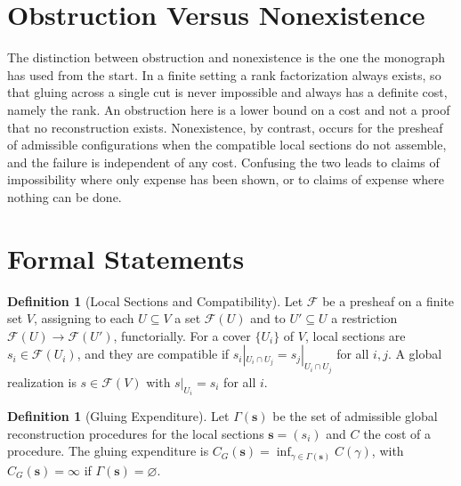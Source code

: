 \documentclass[11pt,letterpaper]{report}
\theoremstyle{plain}
\theoremstyle{definition}
\newtheorem{definition}[theorem]{Definition}
\theoremstyle{remark}
\begin{document}
\section{Obstruction Versus Nonexistence}

The distinction between obstruction and nonexistence is the one the monograph has used from the start. In a finite setting a rank factorization always exists, so that gluing across a single cut is never impossible and always has a definite cost, namely the rank. An obstruction here is a lower bound on a cost and not a proof that no reconstruction exists. Nonexistence, by contrast, occurs for the presheaf of admissible configurations when the compatible local sections do not assemble, and the failure is independent of any cost. Confusing the two leads to claims of impossibility where only expense has been shown, or to claims of expense where nothing can be done.

\section{Formal Statements}

\begin{definition}[Local Sections and Compatibility]\label{def:sections}
Let $\mathcal F$ be a presheaf on a finite set $V$, assigning to each $U\subseteq V$ a set $\mathcal F(U)$ and to $U'\subseteq U$ a restriction $\mathcal F(U)\to\mathcal F(U')$, functorially. For a cover $\{U_i\}$ of $V$, local sections are $s_i\in\mathcal F(U_i)$, and they are compatible if $s_i|_{U_i\cap U_j}=s_j|_{U_i\cap U_j}$ for all $i,j$. A global realization is $s\in\mathcal F(V)$ with $s|_{U_i}=s_i$ for all $i$.
\end{definition}

\begin{definition}[Gluing Expenditure]\label{def:gluing}
Let $\Gamma(\mathbf s)$ be the set of admissible global reconstruction procedures for the local sections $\mathbf s=(s_i)$ and $C$ the cost of a procedure. The gluing expenditure is $C_G(\mathbf s)=\inf_{\gamma\in\Gamma(\mathbf s)}C(\gamma)$, with $C_G(\mathbf s)=\infty$ if $\Gamma(\mathbf s)=\varnothing$.
\end{definition}
\end{document}
